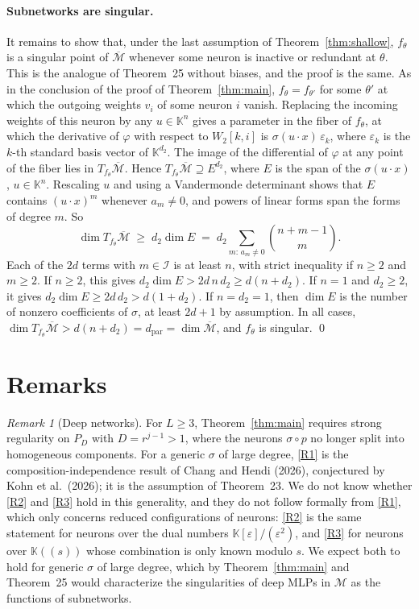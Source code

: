 \documentclass[11pt]{article}
\theoremstyle{definition}
\theoremstyle{remark}
\newtheorem{remark}[lemma]{Remark}
\newcommand{\K}{\mathbb{K}}
\newcommand{\M}{\mathcal{M}}
\newcommand{\Mbar}{\overline{\M}}
\newcommand{\dpar}{d_{\mathrm{par}}}
\begin{document}
\paragraph{Subnetworks are singular.} It remains to show that, under the last assumption of Theorem~\ref{thm:shallow}, $f_\theta$ is a singular point of $\Mbar$ whenever some neuron is inactive or redundant at $\theta$. This is the analogue of Theorem~25 without biases, and the proof is the same. As in the conclusion of the proof of Theorem~\ref{thm:main}, $f_\theta=f_{\theta'}$ for some $\theta'$ at which the outgoing weights $v_i$ of some neuron $i$ vanish. Replacing the incoming weights of this neuron by any $u\in\K^n$ gives a parameter in the fiber of $f_\theta$, at which the derivative of $\varphi$ with respect to $W_2[k,i]$ is $\sigma(u\cdot x)\,\varepsilon_k$, where $\varepsilon_k$ is the $k$-th standard basis vector of $\K^{d_2}$. The image of the differential of $\varphi$ at any point of the fiber lies in $T_{f_\theta}\Mbar$. Hence $T_{f_\theta}\Mbar\supseteq E^{d_2}$, where $E$ is the span of the $\sigma(u\cdot x)$, $u\in\K^n$. Rescaling $u$ and using a Vandermonde determinant shows that $E$ contains $(u\cdot x)^m$ whenever $a_m\ne0$, and powers of linear forms span the forms of degree $m$. So
\[
\dim T_{f_\theta}\Mbar\;\ge\;d_2\dim E\;=\;d_2\sum_{m:\,a_m\ne0}\binom{n+m-1}{m}.
\]
Each of the $2d$ terms with $m\in\mathcal I$ is at least $n$, with strict inequality if $n\ge2$ and $m\ge2$. If $n\ge2$, this gives $d_2\dim E>2d\,n\,d_2\ge d(n+d_2)$. If $n=1$ and $d_2\ge2$, it gives $d_2\dim E\ge2d\,d_2>d(1+d_2)$. If $n=d_2=1$, then $\dim E$ is the number of nonzero coefficients of $\sigma$, at least $2d+1$ by assumption. In all cases, $\dim T_{f_\theta}\Mbar>d(n+d_2)=\dpar=\dim\Mbar$, and $f_\theta$ is singular. \qed

\section{Remarks}

\begin{remark}[Deep networks]\label{rem:deep}
For $L\ge3$, Theorem~\ref{thm:main} requires strong regularity on $P_D$ with $D=r^{j-1}>1$, where the neurons $\sigma\circ p$ no longer split into homogeneous components. For a generic $\sigma$ of large degree, \ref{R1} is the composition-independence result of Chang and Hendi (2026), conjectured by Kohn et al.\ (2026); it is the assumption of Theorem~23. We do not know whether \ref{R2} and \ref{R3} hold in this generality, and they do not follow formally from \ref{R1}, which only concerns reduced configurations of neurons: \ref{R2} is the same statement for neurons over the dual numbers $\K[\varepsilon]/(\varepsilon^2)$, and \ref{R3} for neurons over $\K((s))$ whose combination is only known modulo $s$. We expect both to hold for generic $\sigma$ of large degree, which by Theorem~\ref{thm:main} and Theorem~25 would characterize the singularities of deep MLPs in $\M$ as the functions of subnetworks.
\end{remark}
\end{document}
